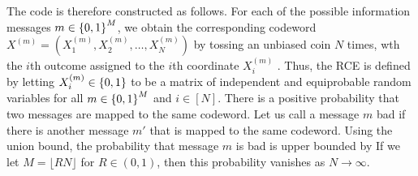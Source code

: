 \documentclass[letterpaper,english,10pt]{article}
\begin{document}
The code is therefore constructed as follows. 
For each of the possible information messages $m \in \left\{0, 1\right\}^M$, 
we obtain the corresponding codeword $X^{(m)} = (X_1^{(m)}, X_2^{(m)}, \dots, X_N^{(m)})$ by tossing an unbiased coin $N$ times, wth the $i$th outcome assigned to the $i$th coordinate $X_i^{(m)}$ .
Thus, the RCE is defined by letting $X_i^{(m)} \in \left\{0,1\right\}$ to be a matrix of independent and equiprobable random variables for all $m \in \left\{0,1\right\}^M$ and $i \in [N]$.  
There is a positive probability that two messages are mapped to the same codeword. 
Let us call a message $m$ bad if there is another message $m'$ that is mapped to the same codeword. Using the union bound, the probability that message $m$ is
bad is upper bounded by
If we let $M = \lfloor RN\rfloor$ for $R \in (0,1)$, then this probability vanishes as $N \to \infty$.
\end{document}
